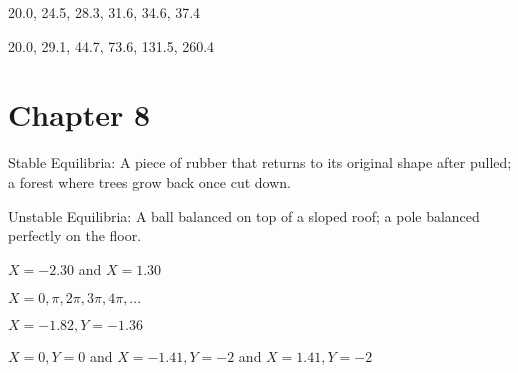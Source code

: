 \documentclass[]{memoir}
\begin{document}
20.0, 24.5, 28.3, 31.6, 34.6, 37.4


20.0, 29.1, 44.7, 73.6, 131.5, 260.4

\section{Chapter 8}


Stable Equilibria: A piece of rubber that returns to its original shape
after pulled; a forest where trees grow back once cut down.

Unstable Equilibria: A ball balanced on top of a sloped roof; a pole
balanced perfectly on the floor.


$X=-2.30$ and $X=1.30$


$X=0,\pi,2\pi,3\pi,4\pi,...$


$X=-1.82, Y=-1.36$


$X=0, Y=0$ and $X=-1.41, Y=-2$ and $X=1.41, Y=-2$
\end{document}
